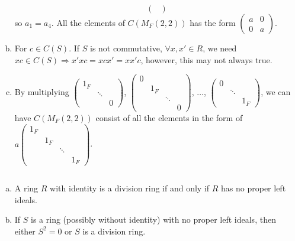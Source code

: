 \begin{answer}
\begin{enumerate}[(a)]
\[\begin{pmatrix}
        \end{pmatrix}\] so $a_{1}=a_{4}$. All the elements of $C(M_{F}(2,2))$ has the form $\begin{pmatrix}
            a&0\\0&a
        \end{pmatrix}$.
        \item For $c\in C(S)$. If $S$ is not commutative, $\forall x,x'\in R$, we need $xc\in C(S)\Rightarrow x'xc=xcx'=xx'c$, however, this may not always true.
        \item By multiplying $\begin{pmatrix}
            1_{F}& &\\ &\ddots & \\ & &0
        \end{pmatrix}$, $\begin{pmatrix}
            0& & &\\ &1_{F}& &\\ & &\ddots&\\ & & &0
        \end{pmatrix}$, $\dots$, $\begin{pmatrix}
            0& &\\ &\ddots & \\ & &1_{F}
        \end{pmatrix}$, we can have $C(M_{F}(2,2))$ consist of all the elements in the form of $a\begin{pmatrix}
            1_{F}& & &\\ &1_{F}& &\\ & &\ddots&\\ & & &1_{F}
        \end{pmatrix}$.
    \end{enumerate}
\end{answer}
$$ $$

\begin{ex}
    \begin{enumerate}[(a)]
        \item A ring $R$ with identity is a division ring if and only if $R$ has no proper left ideals.
        \item If $S$ is a ring (possibly without identity) with no proper left ideals, then either $S^{2}=0$ or $S$ is a division ring.
    \end{enumerate}
\end{ex}

